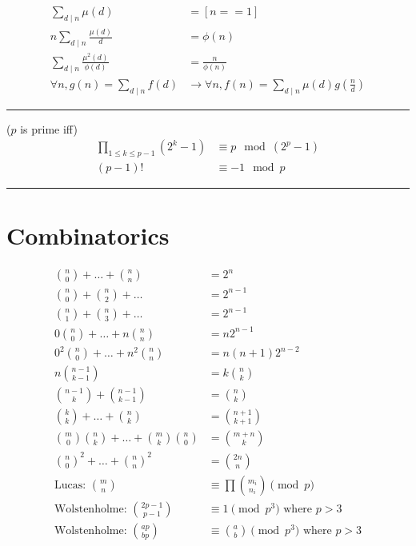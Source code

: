 \documentclass[10pt,landscape]{article}
\begin{document}
\begin{align*}
	\sum_{d \mid n}{\mu(d)} &= [n==1] \\
	n \sum_{d \mid n}{\frac{\mu(d)}{d}} &= \phi(n) \\
	\sum_{d \mid n}{\frac{\mu^2(d)}{\phi(d)}} &= \frac{n}{\phi(n)} \\
	\forall n, g(n) = \sum_{d \mid n}{f(d)} &\rightarrow \forall n, f(n) = \sum_{d \mid n}{\mu(d) g(\frac{n}{d})} %
\end{align*}

\noindent\rule{\linewidth}{1pt}

 ($p$ is prime iff)
\begin{align*}
	\prod_{1 \le k \le p-1}{(2^k - 1)} &\equiv p \mod{(2^p - 1)} \\ %
	(p-1)! &\equiv -1 \mod{p} %
\end{align*}

\noindent\rule{\linewidth}{1pt}

\section{Combinatorics}

\begin{align*}
	\binom{n}{0} + \hdots + \binom{n}{n} &= 2^n \\
	\binom{n}{0} + \binom{n}{2} + \hdots &= 2^{n-1} \\
	\binom{n}{1} + \binom{n}{3} + \hdots &= 2^{n-1} \\
	0 \binom{n}{0} + \hdots + n \binom{n}{n} &= n 2^{n-1} \\
	0^2 \binom{n}{0} + \hdots + n^2 \binom{n}{n} &= n (n+1) 2^{n-2} \\
	n \binom{n-1}{k-1} &= k \binom{n}{k} \\
	\binom{n-1}{k} + \binom{n-1}{k-1} &= \binom{n}{k} \\
	\binom{k}{k} + \hdots + \binom{n}{k} &= \binom{n+1}{k+1} \\
	\binom{m}{0} \binom{n}{k} + \hdots + \binom{m}{k} \binom{n}{0} &= \binom{m+n}{k} \\
	\binom{n}{0}^2 + \hdots + \binom{n}{n}^2 &= \binom{2n}{n} \\
	\text{Lucas: } \binom{m}{n} &\equiv \prod{\binom{m_i}{n_i}} \pmod{p} \\
	\text{Wolstenholme: } \binom{2p-1}{p-1} &\equiv 1 \pmod{p^3} \text{ where } p > 3 \\
	\text{Wolstenholme: } \binom{ap}{bp} &\equiv \binom{a}{b} \pmod{p^3} \text{ where } p > 3
\end{align*}
\end{document}
